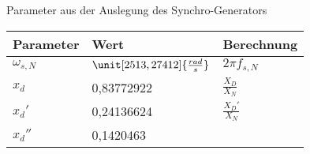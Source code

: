 Parameter aus der Auslegung des Synchro-Generators

\begin{longtable}[]{@{}lll@{}}
\toprule
\begin{minipage}[b]{0.10\columnwidth}\raggedright
Parameter\strut
\end{minipage} & \begin{minipage}[b]{0.25\columnwidth}\raggedright
Wert\strut
\end{minipage} & \begin{minipage}[b]{0.55\columnwidth}\raggedright
Berechnung\strut
\end{minipage}\tabularnewline
\midrule
\endhead
\begin{minipage}[t]{0.10\columnwidth}\raggedright
\(\omega_{s,N}\)\strut
\end{minipage} & \begin{minipage}[t]{0.25\columnwidth}\raggedright
\(\unit[2513,27412]{\frac{rad}{s}}\)\strut
\end{minipage} & \begin{minipage}[t]{0.55\columnwidth}\raggedright
\(2\pi f_{s,N}\)\strut
\end{minipage}\tabularnewline
\begin{minipage}[t]{0.10\columnwidth}\raggedright
\(x_d\)\strut
\end{minipage} & \begin{minipage}[t]{0.25\columnwidth}\raggedright
0,83772922\strut
\end{minipage} & \begin{minipage}[t]{0.55\columnwidth}\raggedright
\(\frac{X_D}{X_N}\)\strut
\end{minipage}\tabularnewline
\begin{minipage}[t]{0.10\columnwidth}\raggedright
\(x_d'\)\strut
\end{minipage} & \begin{minipage}[t]{0.25\columnwidth}\raggedright
0,24136624\strut
\end{minipage} & \begin{minipage}[t]{0.55\columnwidth}\raggedright
\(\frac{X_D'}{X_N}\)\strut
\end{minipage}\tabularnewline
\begin{minipage}[t]{0.10\columnwidth}\raggedright
\(x_d''\)\strut
\end{minipage} & \begin{minipage}[t]{0.25\columnwidth}\raggedright
0,1420463\strut
\end{minipage} & \begin{minipage}[t]{0.55\columnwidth}\raggedright

\end{minipage}
\end{longtable}
